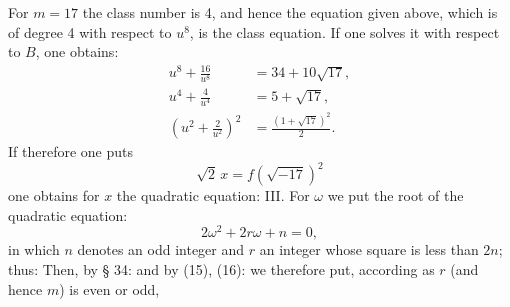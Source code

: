 For $m = 17$ the class number is 4, and hence the equation given
above, which is of degree 4 with respect to $u^8$, is the class
equation. If one solves it with respect to $B$, one obtains:
\[
\begin{aligned}
u^8 + \frac{16}{u^8} &= 34 + 10\sqrt{17}, \\
u^4 + \frac{4}{u^4} &= 5 + \sqrt{17}, \\
\left(u^2 + \frac{2}{u^2}\right)^2 &= \frac{(1+\sqrt{17})^2}{2}.
\end{aligned}
\]
If therefore one puts
\[ \sqrt2\,x = f(\sqrt{-17})^2 \]
one obtains for $x$ the quadratic equation:
III. For $\omega$ we put the root of the quadratic
equation:
\[ 2\omega^2 + 2r\omega + n = 0, \]
in which $n$ denotes an odd integer and $r$ an integer
whose square is less than $2n$; thus:
Then, by § 34:
and by (15), (16):
we therefore put, according as $r$ (and hence $m$) is even or odd,
